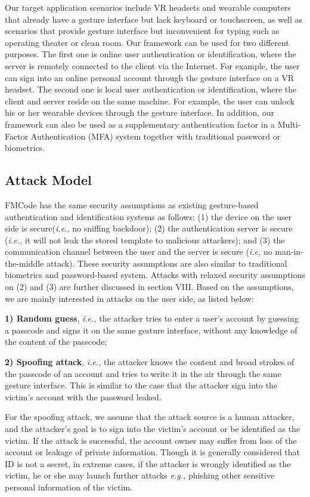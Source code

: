\documentclass[conference]{IEEEtran}
\begin{document}
Our target application scenarios include VR headsets and wearable computers that already have a gesture interface but lack keyboard or touchscreen, as well as scenarios that provide gesture interface but inconvenient for typing such as operating theater or clean room. Our framework can be used for two different purposes. The first one is online user authentication or identification, where the server is remotely connected to the client via the Internet. For example, the user can sign into an online personal account through the gesture interface on a VR headset. The second one is local user authentication or identification, where the client and server reside on the same machine. For example, the user can unlock his or her wearable devices through the gesture interface. In addition, our framework can also be used as a supplementary authentication factor in a Multi-Factor Authentication (MFA) system together with traditional password or biometrics.

\subsection{Attack Model}

FMCode has the same security assumptions as existing gesture-based authentication and identification systems as follows: (1) the device on the user side is secure(\textit{i.e.,} no sniffing backdoor); (2) the authentication server is secure (\textit{i.e.,} it will not leak the stored template to malicious attackers); and (3) the communication channel between the user and the server is secure (\textit{i.e,} no man-in-the-middle attack). These security assumptions are also similar to traditional biometrics and password-based system. Attacks with relaxed security assumptions on (2) and (3) are further discussed in section VIII. Based on the assumptions, we are mainly interested in attacks on the user side, as listed below:
    
\textbf{1) Random guess}, \textit{i.e.,} the attacker tries to enter a user's account by guessing a passcode and signs it on the same gesture interface, without any knowledge of the content of the passcode;
 
\textbf{2) Spoofing attack}, \textit{i.e.,} the attacker knows the content and broad strokes of the passcode of an account and tries to write it in the air through the same gesture interface. This is similar to the case that the attacker sign into the victim's account with the password leaked. 

For the spoofing attack, we assume that the attack source is a human attacker, and the attacker's goal is to sign into the victim's account or be identified as the victim. If the attack is successful, the account owner may suffer from loss of the account or leakage of private information. Though it is generally considered that ID is not a secret, in extreme cases, if the attacker is wrongly identified as the victim, he or she may launch further attacks \textit{e.g.,} phishing other sensitive personal information of the victim. 
\end{document}

